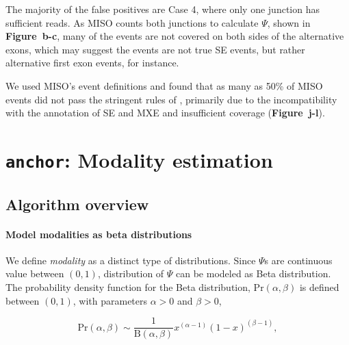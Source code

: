 \clearpage


The majority of the false positives are Case 4, where only one junction has sufficient reads. As MISO counts both junctions to calculate $\Psi$, shown in \textbf{Figure~b-c}, many of the events are not covered on both sides of the alternative exons, which may suggest the events are not true SE events, but rather alternative first exon events, for instance.

We used MISO's event definitions and found that as many as 50\% of MISO events did not pass the stringent rules of \outrigger, primarily due to the incompatibility with the annotation of SE and MXE and insufficient coverage (\textbf{Figure~j-l}).


\section{\texttt{anchor}: Modality estimation}
\label{sec:anchor}

\subsection{Algorithm overview}
\paragraph{Model modalities as beta distributions}

We define \emph{modality} as a distinct type of distributions. Since $\Psi$s are continuous value between $(0, 1)$, distribution of $\Psi$ can be modeled as Beta distribution. The probability density function for the Beta distribution, $\mathrm{Pr}(\alpha, \beta)$ is defined between $(0, 1)$, with parameters $\alpha > 0$ and $\beta > 0$,

\begin{equation}
\mathrm{Pr}(\alpha, \beta) \sim \frac{1}{\mathrm{B}\left(\alpha, \beta\right)}  x^{(\alpha - 1)} \left(1-x\right)^{(\beta-1)},
\end{equation}

